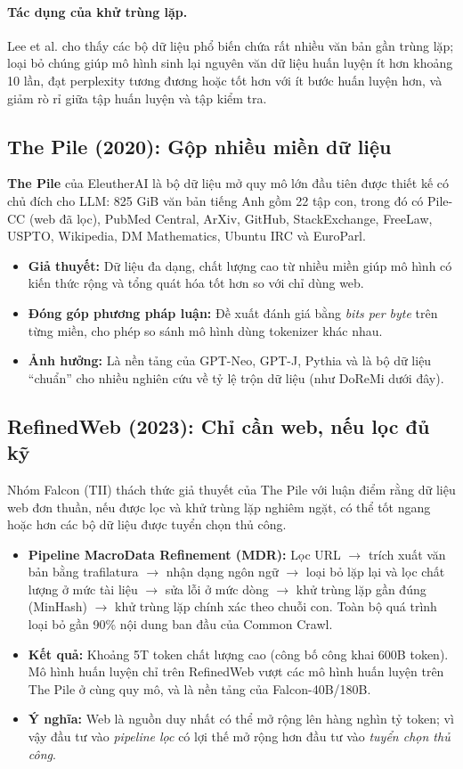 \paragraph{Tác dụng của khử trùng lặp.} Lee et al. \cite{lee2022dedup} cho thấy các bộ dữ liệu phổ biến chứa rất nhiều văn bản gần trùng lặp; loại bỏ chúng giúp mô hình sinh lại nguyên văn dữ liệu huấn luyện ít hơn khoảng 10 lần, đạt perplexity tương đương hoặc tốt hơn với ít bước huấn luyện hơn, và giảm rò rỉ giữa tập huấn luyện và tập kiểm tra.

\subsection{The Pile (2020): Gộp nhiều miền dữ liệu}
\label{ssec:the_pile}
\textbf{The Pile} \cite{gao2020pile} của EleutherAI là bộ dữ liệu mở quy mô lớn đầu tiên được thiết kế có chủ đích cho LLM: 825 GiB văn bản tiếng Anh gồm 22 tập con, trong đó có Pile-CC (web đã lọc), PubMed Central, ArXiv, GitHub, StackExchange, FreeLaw, USPTO, Wikipedia, DM Mathematics, Ubuntu IRC và EuroParl.
\begin{itemize}
	\item \textbf{Giả thuyết:} Dữ liệu đa dạng, chất lượng cao từ nhiều miền giúp mô hình có kiến thức rộng và tổng quát hóa tốt hơn so với chỉ dùng web.
	\item \textbf{Đóng góp phương pháp luận:} Đề xuất đánh giá bằng \emph{bits per byte} trên từng miền, cho phép so sánh mô hình dùng tokenizer khác nhau.
	\item \textbf{Ảnh hưởng:} Là nền tảng của GPT-Neo, GPT-J, Pythia và là bộ dữ liệu “chuẩn” cho nhiều nghiên cứu về tỷ lệ trộn dữ liệu (như DoReMi dưới đây).
\end{itemize}

\subsection{RefinedWeb (2023): Chỉ cần web, nếu lọc đủ kỹ}
\label{ssec:refinedweb}
Nhóm Falcon (TII) \cite{penedo2023refinedweb} thách thức giả thuyết của The Pile với luận điểm rằng dữ liệu web đơn thuần, nếu được lọc và khử trùng lặp nghiêm ngặt, có thể tốt ngang hoặc hơn các bộ dữ liệu được tuyển chọn thủ công.
\begin{itemize}
	\item \textbf{Pipeline MacroData Refinement (MDR):} Lọc URL $\rightarrow$ trích xuất văn bản bằng trafilatura $\rightarrow$ nhận dạng ngôn ngữ $\rightarrow$ loại bỏ lặp lại và lọc chất lượng ở mức tài liệu $\rightarrow$ sửa lỗi ở mức dòng $\rightarrow$ khử trùng lặp gần đúng (MinHash) $\rightarrow$ khử trùng lặp chính xác theo chuỗi con. Toàn bộ quá trình loại bỏ gần 90\% nội dung ban đầu của Common Crawl.
	\item \textbf{Kết quả:} Khoảng 5T token chất lượng cao (công bố công khai 600B token). Mô hình huấn luyện chỉ trên RefinedWeb vượt các mô hình huấn luyện trên The Pile ở cùng quy mô, và là nền tảng của Falcon-40B/180B.
	\item \textbf{Ý nghĩa:} Web là nguồn duy nhất có thể mở rộng lên hàng nghìn tỷ token; vì vậy đầu tư vào \emph{pipeline lọc} có lợi thế mở rộng hơn đầu tư vào \emph{tuyển chọn thủ công}.
\end{itemize}

